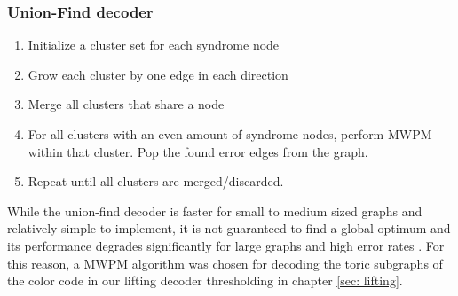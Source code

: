 \subsubsection{Union-Find decoder}
\begin{enumerate}
    \item Initialize a cluster set for each syndrome node
    \item Grow each cluster by one edge in each direction
    \item Merge all clusters that share a node
    \item For all clusters with an even amount of syndrome nodes,
    perform MWPM within that cluster. Pop the found error edges from
    the graph.
    \item Repeat until all clusters are merged/discarded.
\end{enumerate}
While the union-find decoder is faster for small to medium
sized graphs and relatively simple to implement,
 it is not guaranteed to find a global optimum
and its performance degrades significantly for large
graphs and high error rates \cite{UFDecoder}.
For this reason, a MWPM algorithm was chosen for decoding the toric
subgraphs of the color code in our lifting decoder thresholding
in chapter \ref{sec: lifting}.